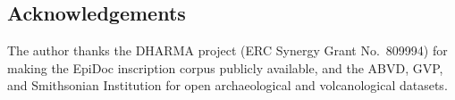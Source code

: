 \documentclass[12pt]{article}
\begin{document}
\subsection*{Acknowledgements}

The author thanks the DHARMA project (ERC Synergy Grant No.\ 809994) for making the EpiDoc inscription corpus publicly available, and the ABVD, GVP, and Smithsonian Institution for open archaeological and volcanological datasets.


\end{document}
